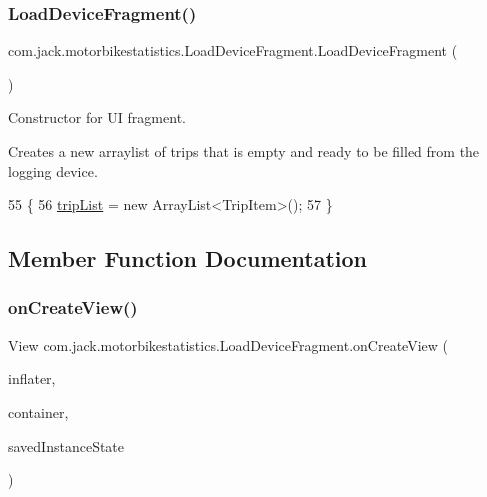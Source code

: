 \subsubsection{\texorpdfstring{Load\+Device\+Fragment()}{LoadDeviceFragment()}}
{\footnotesize\ttfamily com.\+jack.\+motorbikestatistics.\+Load\+Device\+Fragment.\+Load\+Device\+Fragment (\begin{DoxyParamCaption}{ }\end{DoxyParamCaption})\hspace{0.3cm}{\ttfamily [inline]}}



Constructor for UI fragment. 

Creates a new arraylist of trips that is empty and ready to be filled from the logging device. 
\begin{DoxyCode}
55                                 \{
56         \hyperlink{classcom_1_1jack_1_1motorbikestatistics_1_1_load_device_fragment_a92be11df86dfe159ecbdaff59e526464}{tripList} = \textcolor{keyword}{new} ArrayList<TripItem>();
57     \}
\end{DoxyCode}


\subsection{Member Function Documentation}
\mbox{\label{classcom_1_1jack_1_1motorbikestatistics_1_1_load_device_fragment_a9ad9f0d9ef69417e2131613009c02338}} 
\subsubsection{\texorpdfstring{on\+Create\+View()}{onCreateView()}}
{\footnotesize\ttfamily View com.\+jack.\+motorbikestatistics.\+Load\+Device\+Fragment.\+on\+Create\+View (\begin{DoxyParamCaption}\item[{Layout\+Inflater}]{inflater,  }\item[{View\+Group}]{container,  }\item[{Bundle}]{saved\+Instance\+State }\end{DoxyParamCaption})\hspace{0.3cm}{\ttfamily [inline]}}



